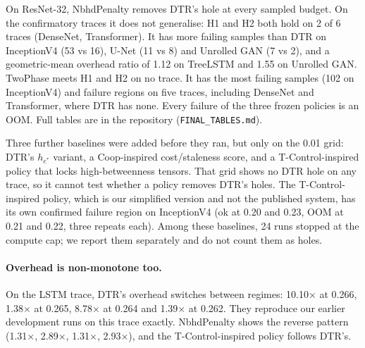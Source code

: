 \documentclass[11pt]{article}
\begin{document}
On ResNet-32, NbhdPenalty removes DTR's hole at every sampled budget. On the confirmatory
traces it does not generalise: H1 and H2 both hold on 2 of 6 traces (DenseNet,
Transformer). It has more failing samples than DTR on InceptionV4 (53 vs 16), U-Net (11 vs
8) and Unrolled GAN (7 vs 2), and a geometric-mean overhead ratio of 1.12 on TreeLSTM and
1.55 on Unrolled GAN. TwoPhase meets H1 and H2 on no trace. It has the most failing samples
(102 on InceptionV4) and failure regions on five traces, including DenseNet and
Transformer, where DTR has none. Every failure of the three frozen policies is an OOM.
Full tables are in the repository (\texttt{FINAL\_TABLES.md}).

Three further baselines were added before they ran, but only on the 0.01 grid: DTR's
$h_{e^*}$ variant, a Coop-inspired cost/staleness score, and a T-Control-inspired policy
that locks high-betweenness tensors. That grid shows no DTR hole on any trace, so it cannot
test whether a policy removes DTR's holes. The T-Control-inspired policy, which is our
simplified version and not the published system, has its own confirmed failure region on
InceptionV4 (ok at 0.20 and 0.23, OOM at 0.21 and 0.22, three repeats each). Among these
baselines, 24 runs stopped at the compute cap; we report them separately and do not count
them as holes.

\paragraph{Overhead is non-monotone too.} On the LSTM trace, DTR's overhead switches between
regimes: 10.10$\times$ at 0.266, 1.38$\times$ at 0.265, 8.78$\times$ at 0.264 and
1.39$\times$ at 0.262. They reproduce our earlier development runs on this trace exactly. NbhdPenalty shows the reverse pattern (1.31$\times$, 2.89$\times$, 1.31$\times$,
2.93$\times$), and the T-Control-inspired policy follows DTR's.
\end{document}
